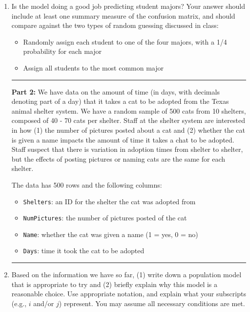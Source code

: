 \documentclass[11pt]{article}
\begin{document}
\begin{enumerate}
\rule{\textwidth}{1pt}

\item Is the model doing a good job predicting student majors? Your answer should include at least one summary measure of the confusion matrix, and should compare against the two types of random guessing discussed in class:
\begin{itemize}
\item Randomly assign each student to one of the four majors, with a 1/4 probability for each major
\item Assign all students to the most common major
\end{itemize}

\pagebreak



\rule{\textwidth}{1pt}

\textbf{Part 2:} We have data on the amount of time (in days, with decimals denoting part of a day) that it takes a cat to be adopted from the Texas animal shelter system. We have a random sample of 500 cats from 10 shelters, composed of 40 - 70 cats per shelter. Staff at the shelter system are interested in how (1) the number of pictures posted about a cat and (2) whether the cat is given a name impacts the amount of time it takes a chat to be adopted. Staff suspect that there is variation in adoption times from shelter to shelter, but the effects of posting pictures or naming cats are the same for each shelter.

The data has 500 rows and the following columns:

\begin{itemize}
\item \texttt{Shelters}: an ID for the shelter the cat was adopted from
\item \texttt{NumPictures}: the number of pictures posted of the cat
\item \texttt{Name}: whether the cat was given a name (1 = yes, 0 = no)
\item \texttt{Days}: time it took the cat to be adopted
\end{itemize}

\rule{\textwidth}{1pt}

\item Based on the information we have so far, (1) write down a population model that is appropriate to try and (2) briefly explain why this model is a reasonable choice. Use appropriate notation, and explain what your subscripts (e.g., $i$ and/or $j$) represent. You may assume all necessary conditions are met. 



\end{enumerate}
\end{document}
